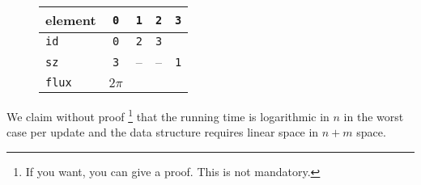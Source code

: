 \documentclass{tufte-handout}
\begin{document}
 \begin{figure}[h]
   \begin{minipage}{3cm}
   \end{minipage}
  \qquad
   \begin{minipage}{4cm}
   \begin{tabular}{lcccc}
     element & \texttt{0} & \texttt{1} & \texttt{2} & \texttt{3} \\  \midrule
     \texttt{id}         & \texttt{0} & \texttt{2} & \texttt{3} \\
     \texttt{sz}         & \texttt{3} &  -- & -- & \texttt{1} \\
     \texttt{flux}    & $2\pi$ \\ 
   \end{tabular}
   \end{minipage}
 \end{figure}


 \medskip
  We claim without proof
  \footnote{If you want, you can give a proof. This is not mandatory.}
  that the running time is logarithmic in $n$ in the worst case per update and the data structure requires linear space in  $n+m$ space.
\end{document}
